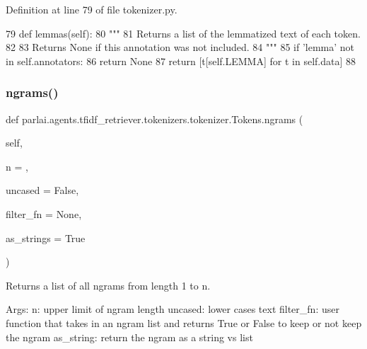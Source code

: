 Definition at line 79 of file tokenizer.\+py.


\begin{DoxyCode}
79     \textcolor{keyword}{def }lemmas(self):
80         \textcolor{stringliteral}{"""}
81 \textcolor{stringliteral}{        Returns a list of the lemmatized text of each token.}
82 \textcolor{stringliteral}{}
83 \textcolor{stringliteral}{        Returns None if this annotation was not included.}
84 \textcolor{stringliteral}{        """}
85         \textcolor{keywordflow}{if} \textcolor{stringliteral}{'lemma'} \textcolor{keywordflow}{not} \textcolor{keywordflow}{in} self.annotators:
86             \textcolor{keywordflow}{return} \textcolor{keywordtype}{None}
87         \textcolor{keywordflow}{return} [t[self.LEMMA] \textcolor{keywordflow}{for} t \textcolor{keywordflow}{in} self.data]
88 
\end{DoxyCode}
\mbox{\label{classparlai_1_1agents_1_1tfidf__retriever_1_1tokenizers_1_1tokenizer_1_1Tokens_ae66797d00194acc3c67b42c7cf17dabf}} 
\subsubsection{\texorpdfstring{ngrams()}{ngrams()}}
{\footnotesize\ttfamily def parlai.\+agents.\+tfidf\+\_\+retriever.\+tokenizers.\+tokenizer.\+Tokens.\+ngrams (\begin{DoxyParamCaption}\item[{}]{self,  }\item[{}]{n = {},  }\item[{}]{uncased = {\ttfamily False},  }\item[{}]{filter\+\_\+fn = {\ttfamily None},  }\item[{}]{as\+\_\+strings = {\ttfamily True} }\end{DoxyParamCaption})}

\begin{DoxyVerb}Returns a list of all ngrams from length 1 to n.

Args:
    n: upper limit of ngram length
    uncased: lower cases text
    filter_fn: user function that takes in an ngram list and returns
      True or False to keep or not keep the ngram
    as_string: return the ngram as a string vs list
\end{DoxyVerb}
 

